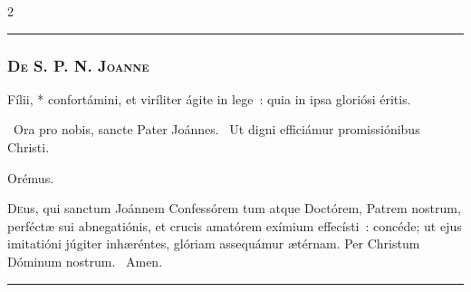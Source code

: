 \documentclass[9pt,twoside]{extarticle}
\begin{document}
\begin{multicols}{2}
\begin{center}\textcolor{red}{\rule{\linewidth}{0.5pt}} \end{center}

\subsubsection*{\center \textsc{De S. P. N. Joanne}}
\begin{tightlist}{}
\item {} Fílii, * confortámini, et viríliter ágite in lege~: quia in ipsa gloriósi éritis.
\item {}~Ora pro nobis, sancte Pater Joánnes. ~Ut digni efficiámur promissiónibus Christi.
\item Orémus. \hfill {}
\end{tightlist}
\lettrine{D}eus, qui sanctum Joánnem Confessórem tum atque Doctórem, Patrem nostrum, perféctæ sui abnegatiónis, et crucis amatórem exímium effecísti~: concéde; ut ejus imitatióni júgiter inhæréntes, glóriam assequámur ætérnam. Per Christum Dóminum nostrum. ~Amen.

\begin{center}\textcolor{red}{\rule{\linewidth}{0.5pt}} \end{center}
\end{multicols}
\end{document}
